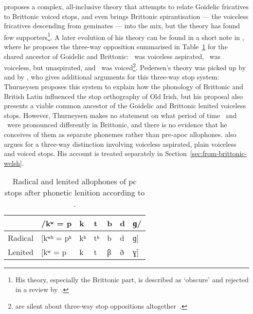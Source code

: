 \Textcite{Ped_Aspirationen97} proposes a complex, all-inclusive theory that attempts  to relate  Goidelic  fricatives to Brittonic voiced stops, and even brings Brittonic spirantisation — the voiceless fricatives descending from geminates — into the mix, but the theory has found few supporters\footnote{His theory, especially the Brittonic part, is described as `obscure' and rejected in a review by~\textcite{Str_Erschienene99}.}. A later evolution of his theory can be found in a short note in  \textcite[§§~149,~303]{Ped_Vergleichende09}, where he proposes the  three-way opposition summarised in Table~\ref{tab:pedersenstops} for the shared ancestor of Goidelic and Brittonic: \xT\ was voiceless aspirated, \lT\ was voiceless, but unaspirated, and \xD\ was voiced\footnote{\Textcite{LP_Concise37} are silent about three-way stop oppositions altogether~\autocite[§~131]{jackson_language_1953}.}.
Pedersen's theory was picked up by \textcite[§~245]{Bau_Grammar24} and by \textcite[§~915]{Thu_grammar46}, who gives additional arguments for this three-way stop system:
Thurneysen proposes this system  to explain how the phonology of Brittonic and British Latin influenced the stop orthography of Old Irish, but his proposal also presents  a viable common ancestor of the Goidelic and Brittonic lenited voiceless stops. However, Thurneysen makes no statement on what period of time  \lT\ and \xD\ were pronounced differently in Brittonic, and there is no evidence that he conceives of them as separate phonemes rather than pre-\gls{apoc} allophones. \Textcite{koch_*cothairche_1990} also argues for a three-way distinction involving voiceless aspirated, plain voiceless and voiced stops. His account is treated separately in Section~\ref{sec:from-brittonic-welsh}.

\begin{table}[h]
  \centering
  \begin{tabular}{lllllll}
    \toprule
    &/kʷ = p & k & t & b & d & ɡ/ \\\midrule
    Radical &[kʷʰ = pʰ& kʰ& tʰ& b & d & ɡ] \\ 
    Lenited &[kʷ = p & k & t & β & ð & ɣ]\\
    \bottomrule
  \end{tabular}
  \caption{Radical and lenited allophones of \gls{pc} stops after phonetic lenition according to \textcite[§§~149,~303]{Ped_Vergleichende09}.}
  \label{tab:pedersenstops}
\end{table}



